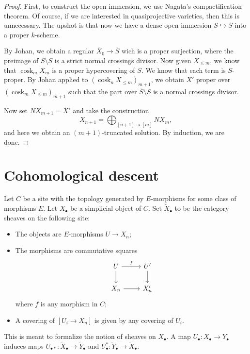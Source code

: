 \documentclass[leqno, openany]{memoir}
\theoremstyle{definition}
\theoremstyle{remark}
\theoremstyle{plain}
\theoremstyle{definition}
\theoremstyle{remark}
\newcommand{\on}[1]{\operatorname{#1}}
\newcommand{\ol}[1]{\overline{#1}}
\newcommand{\wt}[1]{\widetilde{#1}}
\begin{document}
\begin{proof}
    First, to construct the open immersion, we use Nagata's compactification theorem. Of course, if we are interested in quasiprojective varieties, then this is unnecessary. The upshot is that now we have a dense open immersion $S \hookrightarrow \ol{S}$ into a proper $k$-scheme.

    By Johan, we obtain a regular $\ol{X}_0 \to \ol{S}$ wich is a proper surjection, where the preimage of $\ol{S} \setminus S$ is a strict normal crossings divisor. Now given $X_{\leq m}$, we know that $\on{cosk}_m X_m$ is a proper hypercovering of $S$. We know that each term is $S$-proper. By Johan applied to $(\on{cosk}_n X_{\leq m})_{m+1}$, we obtain $\ol{X}'$ proper over $(\on{cosk}_m X_{\leq m})_{m+1}$ such that the part over $\ol{S} \setminus S$ is a normal crossings divisor.

    Now set $NX_{m+1} = \ol{X}'$ and take the construction
    \[ X_{n+1} = \bigoplus_{[n+1] \twoheadrightarrow [m]} N X_m, \]
    and here we obtain an $(m+1)$-truncated solution. By induction, we are done.
\end{proof}

\section{Cohomological descent}%
\label{sec:cohomological_descent}

Let $C$ be a site with the topology generated by $E$-morphisms for some class of morphisms $E$. Let $X_{\bullet}$ be a simplicial object of $C$. Set $\wt{X}_{\bullet}$ to be the category sheaves on the following site:
\begin{itemize}
    \item The objects are $E$-morphisms $U \to X_n$;
    \item The morphisms are commutative squares
        \begin{equation*}
        \begin{tikzcd}
            U \ar{r}{f} \ar{d} & U' \ar{d} \\
            X_n \ar{r} & X_n'
        \end{tikzcd}
        \end{equation*}
        where $f$ is any morphism in $C$;
    \item A covering of $[U_i \to X_n]$ is given by any covering of $U_i$.
\end{itemize}
This is meant to formalize the notion of sheaves on $X_{\bullet}$. A map $U_{\bullet} \colon X_{\bullet} \to Y_{\bullet}$ induces maps $U_{\bullet *} \colon \wt{X}_{\bullet} \to \wt{Y}_{\bullet}$ and $U_{\bullet}^* \colon \wt{Y}_{\bullet} \to \wt{X}_{\bullet}$.
\end{document}
